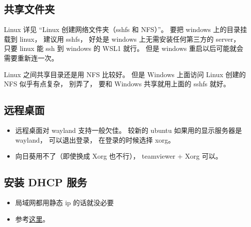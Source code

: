 \subsection{共享文件夹}
Linux 详见 “Linux 创建网络文件夹（sshfs 和 NFS）”。 要把 windows 上的目录挂载到 linux， 建议用 sshfs， 好处是 windows 上无需安装任何第三方的 server， 只要 linux 能 ssh 到 windows 的 WSL1 就行。 但是 windows 重启以后可能就会需要重新连一次。

Linux 之间共享目录还是用 NFS 比较好。 但是 Windows 上面访问 Linux 创建的 NFS 似乎有点复杂， 别弄了， 要和 Windows 共享就用上面的 sshfs 就好。

\subsection{远程桌面}
\begin{itemize}
\item 远程桌面对 wayland 支持一般欠佳。 较新的 ubuntu 如果用的显示服务器是 wayland， 可以退出登录， 在登录的时候选择 xorg。
\item 向日葵用不了（即使换成 Xorg 也不行）， teamviewer + Xorg 可以。
\end{itemize}

\subsection{安装 DHCP 服务}
\begin{itemize}
\item 局域网都用静态 ip 的话就没必要
\item 参考\href{https://www.linuxtechi.com/how-to-configure-dhcp-server-on-ubuntu/}{这里}。
\end{itemize}
